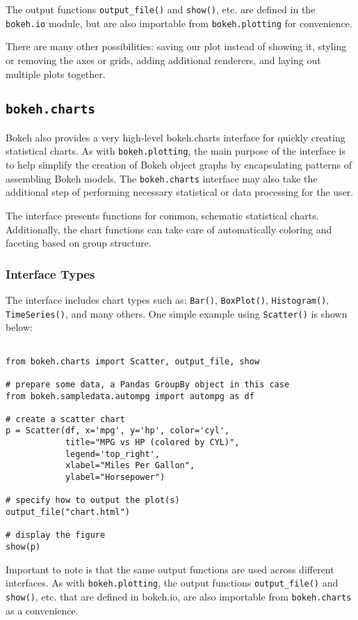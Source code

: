 \documentclass[a4paper,12pt]{article}
\begin{document}
The output functions \texttt{output\_file()} and \texttt{show()}, etc. are defined in the \texttt{bokeh.io} module, but are also importable from \texttt{bokeh.plotting} for convenience.


There are many other possibilities: saving our plot instead of showing it, styling or removing the axes or grids, adding additional renderers, and laying out multiple plots together. 


\newpage
\subsection{\texttt{bokeh.charts}}
Bokeh also provides a very high-level bokeh.charts interface for quickly creating statistical charts. As with \texttt{bokeh.plotting}, the main purpose of the interface is to help simplify the creation of Bokeh object graphs by encapsulating patterns of assembling Bokeh models. The \texttt{bokeh.charts} interface may also take the additional step of performing necessary statistical or data processing for the user. 

The interface presents functions for common, schematic statistical charts. Additionally, the chart functions can take care of automatically coloring and faceting based on group structure.
\subsubsection{Interface Types}
The interface includes chart types such as: \texttt{Bar()}, \texttt{BoxPlot()}, \texttt{Histogram()}, \texttt{TimeSeries()}, and many others. One simple example using \texttt{Scatter()} is shown below:
\begin{framed}
	\begin{verbatim}
	
from bokeh.charts import Scatter, output_file, show

# prepare some data, a Pandas GroupBy object in this case
from bokeh.sampledata.autompg import autompg as df

# create a scatter chart
p = Scatter(df, x='mpg', y='hp', color='cyl',
            title="MPG vs HP (colored by CYL)",
            legend='top_right',
            xlabel="Miles Per Gallon",
            ylabel="Horsepower")

# specify how to output the plot(s)
output_file("chart.html")

# display the figure
show(p)
\end{verbatim}
\end{framed}
Important to note is that the same output functions are used across different interfaces. As with \texttt{bokeh.plotting}, the output functions \texttt{output\_file()} and \texttt{show()}, etc. that are defined in bokeh.io, are also importable from \texttt{bokeh.charts} as a convenience.
\end{document}
